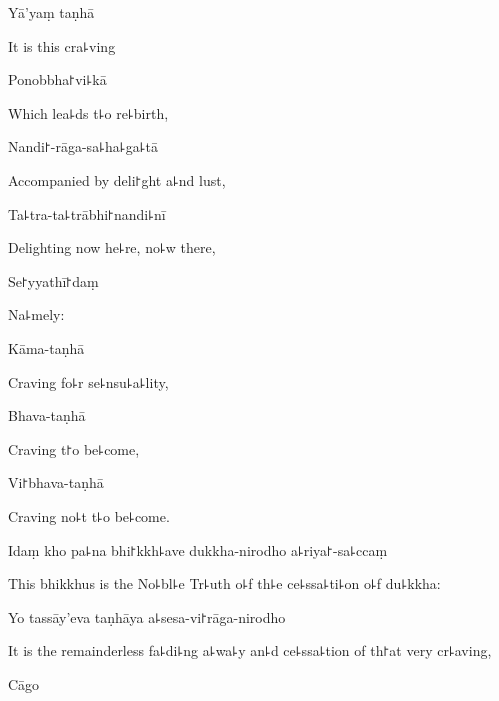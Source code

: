 Yā'yaṃ taṇhā

\begin{english}
  It is this cra꜕ving
\end{english}

Ponobbha꜓vi꜕kā

\begin{english}
  Which lea꜕ds t꜕o re꜕birth,
\end{english}

Nandi꜓-rāga-sa꜕ha꜕ga꜕tā

\begin{english}
  Accompanied by deli꜓ght a꜕nd lust,
\end{english}

Ta꜕tra-ta꜕trābhi꜓nandi꜕nī

\begin{english}
  Delighting now he꜕re, no꜕w there,
\end{english}

Se꜓yyathī꜓daṃ

\begin{english}
  Na꜕mely:
\end{english}

Kāma-taṇhā

\begin{english}
  Craving fo꜕r se꜕nsu꜕a꜕lity,
\end{english}

Bhava-taṇhā

\begin{english}
  Craving t꜓o be꜕come,
\end{english}

Vi꜓bhava-taṇhā

\begin{english}
  Craving no꜕t t꜕o be꜕come.
\end{english}

Idaṃ kho pa꜕na bhi꜓kkh꜕ave dukkha-nirodho a꜕riya꜓-sa꜕ccaṃ

\begin{english}
  This bhikkhus is the No꜕bl꜕e Tr꜕uth o꜕f th꜕e ce꜕ssa꜕ti꜕on o꜕f du꜕kkha:
\end{english}

Yo tassāy'eva taṇhāya a꜕sesa-vi꜓rāga-nirodho

\begin{english}
  It is the remainderless fa꜕di꜕ng a꜕wa꜕y an꜕d ce꜕ssa꜕tion of th꜓at very cr꜕aving,
\end{english}

Cāgo


